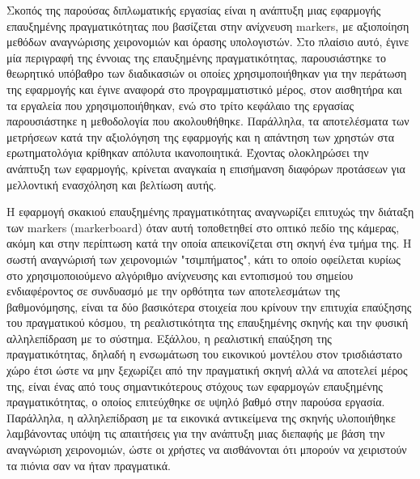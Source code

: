 



Σκοπός της παρούσας διπλωματικής εργασίας είναι η ανάπτυξη μιας εφαρμογής επαυξημένης πραγματικότητας που βασίζεται στην ανίχνευση markers, με αξιοποίηση μεθόδων αναγνώρισης χειρονομιών και όρασης υπολογιστών. Στο πλαίσιο αυτό, έγινε μία περιγραφή της έννοιας της επαυξημένης πραγματικότητας, παρουσιάστηκε το θεωρητικό υπόβαθρο των διαδικασιών οι οποίες χρησιμοποιήθηκαν για την περάτωση της εφαρμογής και έγινε αναφορά στο προγραμματιστικό μέρος, στον αισθητήρα και τα εργαλεία που χρησιμοποιήθηκαν, ενώ στο τρίτο κεφάλαιο της εργασίας παρουσιάστηκε η μεθοδολογία που ακολουθήθηκε. Παράλληλα, τα αποτελέσματα των μετρήσεων κατά την αξιολόγηση της εφαρμογής και η απάντηση των χρηστών στα ερωτηματολόγια κρίθηκαν απόλυτα ικανοποιητικά. Έχοντας ολοκληρώσει την ανάπτυξη των εφαρμογής, κρίνεται αναγκαία η επισήμανση διαφόρων προτάσεων για μελλοντική ενασχόληση και βελτίωση αυτής.


Η εφαρμογή σκακιού επαυξημένης πραγματικότητας αναγνωρίζει επιτυχώς την διάταξη των markers (markerboard) όταν αυτή τοποθετηθεί στο οπτικό πεδίο της κάμερας, ακόμη και στην περίπτωση κατά την οποία απεικονίζεται στη σκηνή ένα τμήμα της. Η σωστή αναγνώρισή των χειρονομιών "τσιμπήματος", κάτι το οποίο οφείλεται κυρίως στο χρησιμοποιούμενο αλγόριθμο ανίχνευσης και εντοπισμού του σημείου ενδιαφέροντος σε συνδυασμό με την ορθότητα των αποτελεσμάτων της βαθμονόμησης, είναι τα δύο βασικότερα στοιχεία που κρίνουν την επιτυχία επαύξησης του πραγματικού κόσμου, τη ρεαλιστικότητα της επαυξημένης σκηνής και την φυσική αλληλεπίδραση με το σύστημα. Εξάλλου, η ρεαλιστική επαύξηση της πραγματικότητας, δηλαδή η ενσωμάτωση του εικονικού μοντέλου στον τρισδιάστατο χώρο έτσι ώστε να μην ξεχωρίζει από την πραγματική σκηνή αλλά να αποτελεί μέρος της, είναι ένας από τους σημαντικότερους στόχους των εφαρμογών επαυξημένης πραγματικότητας, ο οποίος επιτεύχθηκε σε υψηλό βαθμό στην παρούσα εργασία. Παράλληλα, η αλληλεπίδραση με τα εικονικά αντικείμενα της σκηνής υλοποιήθηκε λαμβάνοντας υπόψη τις απαιτήσεις για την ανάπτυξη μιας διεπαφής με βάση την αναγνώριση χειρονομιών, ώστε οι χρήστες να αισθάνονται ότι μπορούν να χειριστούν τα πιόνια σαν να ήταν πραγματικά.


